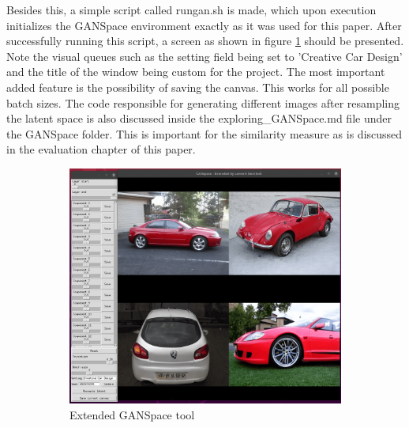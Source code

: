 Besides this, a simple script called rungan.sh is made, which upon execution initializes the GANSpace environment exactly as it was used for this paper.
After successfully running this script, a screen as shown in figure \ref{fig:extended_ganspace_tool} should be presented.
Note the visual queues such as the setting field being set to 'Creative Car Design' and the title of the window being custom for the project.
The most important added feature is the possibility of saving the canvas.
This works for all possible batch sizes.
The code responsible for generating different images after resampling the latent space is also discussed inside the exploring\_GANSpace.md file under the GANSpace folder.
This is important for the similarity measure as is discussed in the evaluation chapter of this paper.


\begin{figure}
\centering
\begin{subfigure}{.5\textwidth}
  \centering
  \includegraphics[width=\textwidth]{images/extended_ganspace.png}
  \caption{Extended GANSpace tool}
  \label{fig:extended_ganspace_tool}
\end{subfigure}%
\hspace{1cm}
\begin{subfigure}{.4\textwidth}
  \centering

\end{subfigure}
\end{figure}
